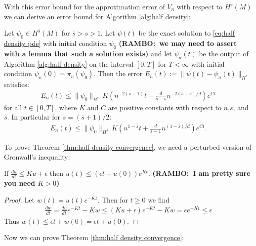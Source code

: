 \documentclass[final,leqno]{siamltex1213}
\newcommand{\ram}[1]{{\normalsize{\textbf{({\color{red}RAMBO:\ }#1)}}}}
\begin{document}
With this error bound for the approximation error of $V_{n}$ with respect to $H^{s}(M)$ we can derive an error bound for Algorithm \ref{alg:half density}:

\begin{theorem} \label{thm:half density convergence}
	Let $\psi_{0} \in H^{\bar{s}}(M)$ for $\bar{s} > s > 1$.
	Let $\psi(t)$ be the exact solution to \eqref{eq:half density pde} with initial condition $\psi_{0}$ \ram{we may need to assert with a lemma that such a solution exists} and let $\psi_{n}(t)$ be the output of Algorithm \ref{alg:half density} on the interval $[0,T]$ for $T < \infty$ with initial condition $\psi_{n}(0) = \pi_{n}(\psi_{0})$.
	Then the error $E_{n}(t) := \| \psi(t) - \psi_{n}(t) \|_{H^{s}}$ satisfies:
	\begin{align}
		E_{n}(t) \leq \| \psi_{0} \|_{H^{\bar{s}}} \, K \left( n^{-2(s-1)} t+  \frac{d}{\bar{s}-s} n^{-2(\bar{s}-s)/d} \right) e^{C t}
	\end{align}
	for all $t \in [0,T]$, where $K$ and $C$ are positive constants with respect to $n$,$s$, and $\bar{s}$. In particular for $s = (\bar{s}+1)/2$:
	\begin{align}
			E_{n}(t) \leq \| \psi_{0} \|_{H^{\bar{s}}} \, K \left( n^{1-\bar{s}} t+  \frac{d}{\bar{s}-1} n^{(1-\bar{s})/d} \right) e^{C t}.
	\end{align}
\end{theorem}

\noindent To prove Theorem \ref{thm:half density convergence}, we need a perturbed version of Gronwall's inequality:
\begin{lemma} \label{lem:Gronwall}
If $\frac{du}{dt} \leq Ku + \epsilon$ then $u(t) \leq (\epsilon t + u(0) ) e^{Kt}$. \ram{I am pretty sure you need $K>0$}
\end{lemma}
\begin{proof}
	Let $w (t)= u (t) e^{-Kt}$.  Then for $t \geq 0$ we find
	\begin{align}
		\frac{dw}{dt} = \frac{du}{dt} e^{-Kt} - K w \leq (Ku+\epsilon) e^{-Kt} - Kw = \epsilon e^{-Kt} \leq \epsilon
	\end{align}
	Thus $w(t) \leq \epsilon t + w(0) = \epsilon t + u(0)$.
\end{proof}

Now we can prove Theorem \ref{thm:half density convergence}:
\end{document}
